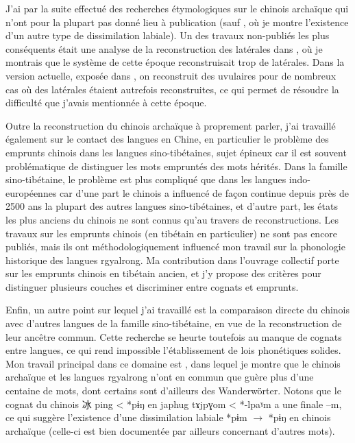 \documentclass[oldfontcommands,oneside,a4paper,11pt]{memoir}
\newcommand{\ipa}[1]{{\phon #1}} %
\newcommand{\zh}[1]{{\cn #1}}
\begin{document}
J'ai par la suite effectué des recherches étymologiques sur le chinois archaïque qui n'ont pour la plupart pas donné lieu à publication (sauf \citet{jacques03dissimilation}, où je montre l'existence d'un autre type de dissimilation labiale). Un des travaux non-publiés les plus conséquents était une analyse de  la reconstruction des latérales dans \citet{sagart99roc}, où je montrais que le système de cette époque reconstruisait trop de latérales. Dans la version actuelle, exposée dans \citet{sagart-baxter09}, on reconstruit des uvulaires pour de nombreux cas où des latérales étaient autrefois reconstruites, ce qui permet de résoudre la difficulté que j'avais mentionnée à cette époque.

Outre la reconstruction du chinois archaïque à proprement parler, j'ai travaillé également sur le contact des langues en Chine, en particulier le problème des emprunts chinois dans les langues sino-tibétaines, sujet épineux car il est souvent problématique de distinguer les mots empruntés des mots hérités. Dans la famille sino-tibétaine, le problème est plus compliqué que dans les langues indo-européennes car d’une part le chinois a influencé de façon continue depuis près de 2500 ans la plupart des autres langues sino-tibétaines, et d’autre part, les états les plus anciens du chinois ne sont connus qu’au travers de reconstructions. Les travaux sur les emprunts chinois (en tibétain en particulier) ne sont pas encore publiés, mais ils ont méthodologiquement influencé mon travail sur la phonologie historique des langues rgyalrong. Ma contribution dans l'ouvrage collectif \citet{jacques13jieci} porte sur les emprunts chinois en tibétain ancien, et j'y propose des critères pour distinguer plusieurs couches et discriminer entre cognats et emprunts.

Enfin, un autre point sur lequel j'ai travaillé est la comparaison directe du chinois avec d'autres langues de la famille sino-tibétaine, en vue de la reconstruction de leur ancêtre commun. Cette recherche se heurte toutefois au manque de cognats entre langues, ce qui rend impossible l'établissement de lois phonétiques solides. Mon travail principal dans ce domaine est \citet{jacques05}, dans lequel je montre que le chinois archaïque et les langues rgyalrong n'ont en commun que guère plus d'une centaine de mots, dont certains sont d'ailleurs des Wanderwörter. Notons que le cognat du chinois \zh{冰} ping < *pɨŋ en japhug \ipa{tɤjpɣom} < *-lpaˠm a une finale --m, ce qui suggère l'existence d'une dissimilation labiale *pɨm $\rightarrow $ *pɨŋ en chinois archaïque (celle-ci est bien documentée par ailleurs concernant d'autres mots).
\end{document}
